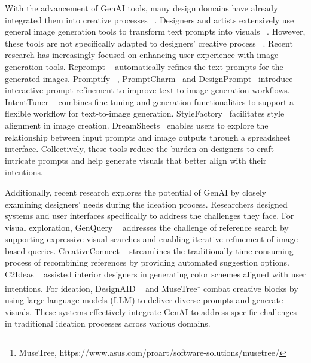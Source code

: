 
With the advancement of GenAI tools, many design domains have already integrated them into creative processes ~\cite{ko2023large, qin2023does}. Designers and artists extensively use general image generation tools to transform text prompts into visuals ~\cite{Epstein2023Art, Rick2023Supermind}. However, these tools are not specifically adapted to designers' creative process ~\cite{boucher2024resistance, vimpari2023adapt}.
Recent research has increasingly focused on enhancing user experience with image-generation tools. Reprompt ~\cite{wang2023reprompt} automatically refines the text prompts for the generated images.
Promptify ~\cite{rw23}, PromptCharm~\cite{PromptCharm2024} and DesignPrompt~\cite{DesignPrompt2024} introduce interactive prompt refinement to improve text-to-image generation workflows. IntentTuner ~\cite{zeng2024intenttuner} combines fine-tuning and generation functionalities to support a flexible workflow for text-to-image generation. StyleFactory~\cite{zhou2024stylefactory}
facilitates style alignment in image creation. DreamSheets~\cite{almeda2024prompting} enables users to explore the relationship between input prompts and image outputs through a spreadsheet interface. Collectively, these tools reduce the burden on designers to craft intricate prompts and help generate visuals that better align with their intentions.

Additionally, recent research explores the potential of GenAI by closely examining designers' needs during the ideation process. Researchers designed systems and user interfaces specifically to address the challenges they face.
For visual exploration, GenQuery ~\cite{son2024genquery} addresses the challenge of reference search by supporting expressive visual searches and enabling iterative refinement of image-based queries. 
CreativeConnect ~\cite{choi2024creativeconnect} streamlines the traditionally time-consuming process of recombining references by providing automated suggestion options.  C2Ideas ~\cite{hou2024c2ideas} assisted interior designers in generating color schemes aligned with user intentions. 
For ideation, DesignAID ~\cite{rw22} and MuseTree\footnote{MuseTree, https://www.asus.com/proart/software-solutions/musetree/} combat creative blocks by using large language models (LLM) to deliver diverse prompts and generate visuals. These systems effectively integrate GenAI to address specific challenges in traditional ideation processes across various domains. 

